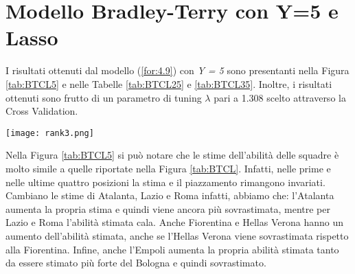 \section{Modello Bradley-Terry con Y=5 e Lasso}
I risultati ottenuti dal modello (\ref{for:4.9}) con \emph{Y = 5} sono presentanti nella Figura \ref{tab:BTCL5} e nelle Tabelle \ref{tab:BTCL25} e \ref{tab:BTCL35}. Inoltre, i risultati ottenuti sono frutto di un parametro di tuning $\lambda$ pari a 1.308 scelto attraverso la Cross Validation.
\begin{sidewaysfigure} 
	\centering
	\begin{center}
		\texttt{[image: rank3.png]}
		\caption{Barplot che indica per ogni squadra l'abilità stimata dal modello (\ref{for:4.9}) con \emph{Y = 5}. Viene indicato con un asterisco le squadre con un piazzamento stimato diverso da quello reale anche esso riportato a destra del grafico.} \label{tab:BTCL5} 
	\end{center}
\end{sidewaysfigure}
Nella Figura \ref{tab:BTCL5} si può notare che le stime dell'abilità delle squadre è molto simile a quelle riportate nella Figura \ref{tab:BTCL}. Infatti, nelle prime e nelle ultime quattro posizioni la stima e il piazzamento rimangono invariati. Cambiano le stime di Atalanta, Lazio e Roma infatti, abbiamo che: l'Atalanta aumenta la propria stima e quindi viene ancora più sovrastimata, mentre per Lazio e Roma l'abilità stimata cala. Anche Fiorentina e Hellas Verona hanno un aumento dell'abilità stimata, anche se l'Hellas Verona viene sovrastimata rispetto alla Fiorentina. Infine, anche l'Empoli aumenta la propria abilità stimata tanto da essere stimato più forte del Bologna e quindi sovrastimato.\\
